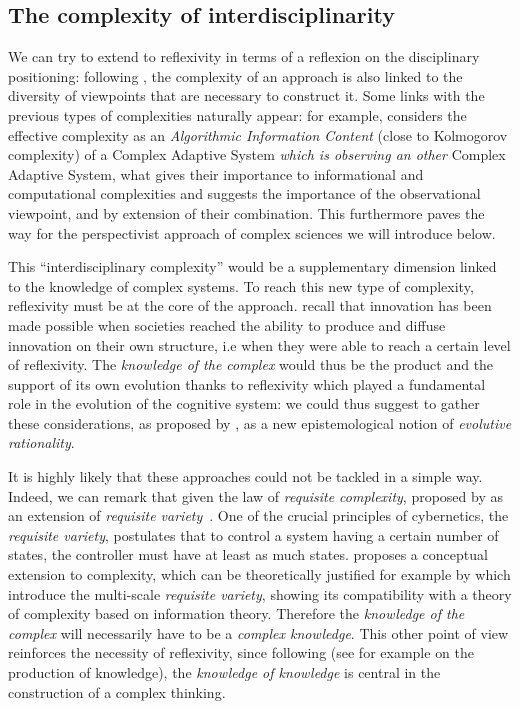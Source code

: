 \subsection{The complexity of interdisciplinarity}


We can try to extend to reflexivity in terms of a reflexion on the disciplinary positioning: following \cite{pumain2005cumulativite}, the complexity of an approach is also linked to the diversity of viewpoints that are necessary to construct it. Some links with the previous types of complexities naturally appear: for example, \cite{gell1995quark} considers the effective complexity as an \emph{Algorithmic Information Content} (close to Kolmogorov complexity) of a Complex Adaptive System \emph{which is observing an other} Complex Adaptive System, what gives their importance to informational and computational complexities and suggests the importance of the observational viewpoint, and by extension of their combination. This furthermore paves the way for the perspectivist approach of complex sciences we will introduce below. 

This ``interdisciplinary complexity'' would be a supplementary dimension linked to the knowledge of complex systems. To reach this new type of complexity, reflexivity must be at the core of the approach. \cite{read2009innovation} recall that innovation has been made possible when societies reached the ability to produce and diffuse innovation on their own structure, i.e when they were able to reach a certain level of reflexivity. The \emph{knowledge of the complex} would thus be the product and the support of its own evolution thanks to reflexivity which played a fundamental role in the evolution of the cognitive system: we could thus suggest to gather these considerations, as proposed by , as a new epistemological notion of \emph{evolutive rationality}.


It is highly likely that these approaches could not be tackled in a simple way. Indeed, we can remark that given the law of \emph{requisite complexity}, proposed by \cite{gershenson2015requisite} as an extension of \emph{requisite variety}~\cite{ashby1991requisite}. One of the crucial principles of cybernetics, the \emph{requisite variety}, postulates that to control a system having a certain number of states, the controller must have at least as much states. \cite{gershenson2015requisite} proposes a conceptual extension to complexity, which can be theoretically justified for example by \cite{allen2017multiscale} which introduce the multi-scale \emph{requisite variety}, showing its compatibility with a theory of complexity based on information theory. Therefore the \emph{knowledge of the complex} will necessarily have to be a \emph{complex knowledge}. This other point of view reinforces the necessity of reflexivity, since following  (see for example \cite{morin1991methode} on the production of knowledge), the \emph{knowledge of knowledge} is central in the construction of a complex thinking.



